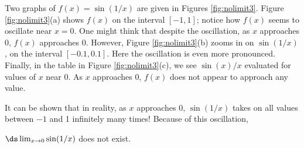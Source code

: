 \pagebreak

%
{%
Two graphs of $f(x) = \sin(1/x)$ are given in Figures \ref{fig:nolimit3}. Figure \ref{fig:nolimit3}(a) shows $f(x)$ on the interval $[-1,1]$; notice how $f(x)$ seems to oscillate near $x=0$. One might think that despite the oscillation, as $x$ approaches 0, $f(x)$ approaches 0. However, Figure \ref{fig:nolimit3}(b) zooms in on $\sin(1/x)$, on the interval $[-0.1,0.1]$. Here the oscillation is even more pronounced. Finally, in the table in Figure \ref{fig:nolimit3}(c), we see $\sin(x)/x$ evaluated for values of $x$ near 0. As $x$ approaches 0, $f(x)$ does not appear to approach any value. 

It can be shown that in reality, as $x$ approaches 0, $\sin(1/x)$ takes on all values between $-1$ and 1 infinitely many times! Because of this oscillation,

 $\ds\lim_{x\to 0}\sin(1/x)$ does not exist.}\\

